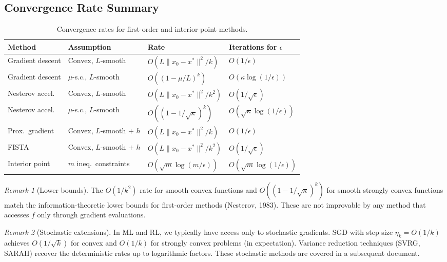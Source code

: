 \documentclass[11pt,a4paper]{article}
\theoremstyle{definition}
\theoremstyle{plain}
\theoremstyle{remark}
\newtheorem{remark}{Remark}[section]
\begin{document}
\subsection{Convergence Rate Summary}

\begin{table}[h]
\centering
\caption{Convergence rates for first-order and interior-point methods.}
\label{tab:rates}
\renewcommand{\arraystretch}{1.3}
\begin{tabular}{@{}llll@{}}
\toprule
\textbf{Method} & \textbf{Assumption} & \textbf{Rate} & \textbf{Iterations for $\epsilon$} \\
\midrule
Gradient descent & Convex, $L$-smooth &
  $O(L\|x_0-x^*\|^2/k)$ & $O(1/\epsilon)$ \\
Gradient descent & $\mu$-s.c., $L$-smooth &
  $O((1-\mu/L)^k)$ & $O(\kappa\log(1/\epsilon))$ \\
Nesterov accel. & Convex, $L$-smooth &
  $O(L\|x_0-x^*\|^2/k^2)$ & $O(1/\sqrt{\epsilon})$ \\
Nesterov accel. & $\mu$-s.c., $L$-smooth &
  $O((1-1/\sqrt{\kappa})^k)$ & $O(\sqrt{\kappa}\log(1/\epsilon))$ \\
Prox.\ gradient & Convex, $L$-smooth $+$ $h$ &
  $O(L\|x_0-x^*\|^2/k)$ & $O(1/\epsilon)$ \\
FISTA & Convex, $L$-smooth $+$ $h$ &
  $O(L\|x_0-x^*\|^2/k^2)$ & $O(1/\sqrt{\epsilon})$ \\
Interior point & $m$ ineq.\ constraints &
  $O(\sqrt{m}\log(m/\epsilon))$ & $O(\sqrt{m}\log(1/\epsilon))$ \\
\bottomrule
\end{tabular}
\end{table}

\begin{remark}[Lower bounds]\label{rem:lower}
The $O(1/k^2)$ rate for smooth convex functions and $O((1-1/\sqrt{\kappa})^k)$
for smooth strongly convex functions match the information-theoretic lower bounds
for first-order methods (Nesterov, 1983). These are not improvable by any
method that accesses $f$ only through gradient evaluations.
\end{remark}

\begin{remark}[Stochastic extensions]\label{rem:stochastic}
In ML and RL, we typically have access only to stochastic gradients. SGD with
step size $\eta_k = O(1/k)$ achieves $O(1/\sqrt{k})$ for convex and $O(1/k)$
for strongly convex problems (in expectation). Variance reduction techniques
(SVRG, SARAH) recover the deterministic rates up to logarithmic factors. These
stochastic methods are covered in a subsequent document.
\end{remark}
\end{document}

